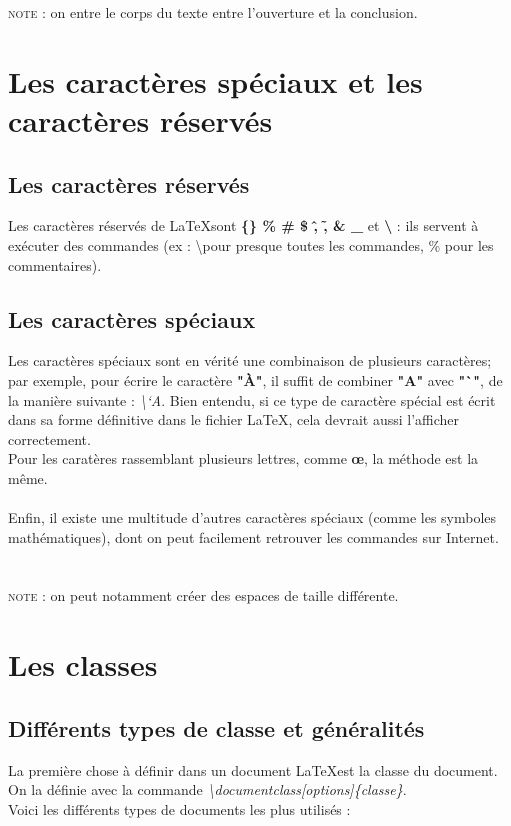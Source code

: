 \documentclass[a4paper, 10pt]{book}
\begin{document}
 \textsc{note :} on entre le corps du texte entre l'ouverture et la conclusion.

\chapter{Les caractères spéciaux et les caractères réservés}
\section{Les caractères réservés}

Les caractères réservés de \LaTeX sont \textbf{\{\}  \%  \# \$ \^,  \~ , \&  \_} et \textbf{\textbackslash} : ils servent à exécuter des commandes (ex : \textbackslash pour presque toutes les commandes, \% pour les commentaires).

\section{Les caractères spéciaux}

Les caractères spéciaux sont en vérité une combinaison de plusieurs caractères; par exemple, pour écrire le caractère \textbf{"À"}, il suffit de combiner \textbf{"A"} avec \textbf{"`"}, de la manière suivante : \textit{\textbackslash `A}. Bien entendu, si ce type de caractère spécial est écrit dans sa forme définitive dans le fichier \LaTeX, cela devrait aussi l'afficher correctement.\\ 
Pour les caratères rassemblant plusieurs lettres, comme \textbf{\oe}, la méthode est la même.\\\\
Enfin, il existe une multitude d'autres caractères spéciaux (comme les symboles mathématiques), dont on peut facilement retrouver les commandes sur Internet. \\ \\ \\
\textsc{note :} on peut notamment créer des espaces de taille différente.

\chapter{Les classes}
\section{Différents types de classe et généralités}
La première chose à définir dans un document \LaTeX est la classe du document. On la définie avec la commande \textit{\textbackslash documentclass[options]\{classe\}}.\\
Voici les différents types de documents les plus utilisés : 
\end{document}
